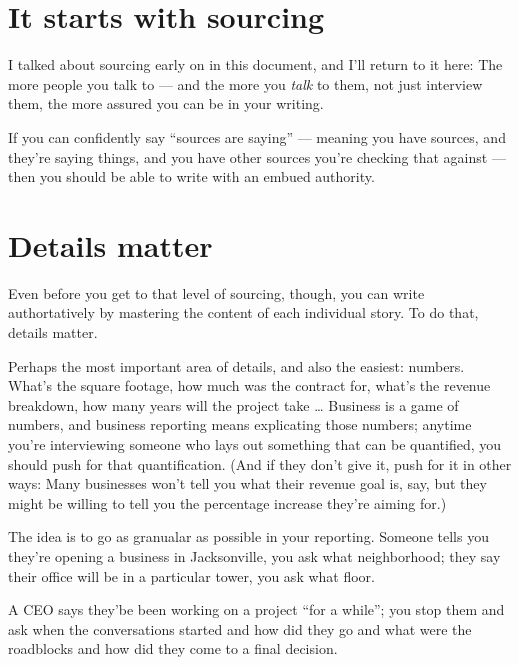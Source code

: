 \documentclass[
  11pt,
  american,
  letterpaperpaper,
  extrafontsizes,onecolumn,openright
  ]{memoir}
\begin{document}
\hypertarget{it-starts-with-sourcing}{%
\section*{It starts with sourcing}\label{it-starts-with-sourcing}}

I talked about sourcing early on in this document, and I'll return to it here: The more people you talk to --- and the more you \emph{talk} to them, not just interview them, the more assured you can be in your writing.

If you can confidently say \enquote{sources are saying} --- meaning you have sources, and they're saying things, and you have other sources you're checking that against --- then you should be able to write with an embued authority.

\hypertarget{details-matter}{%
\section*{Details matter}\label{details-matter}}

Even before you get to that level of sourcing, though, you can write authortatively by mastering the content of each individual story. To do that, details matter.

Perhaps the most important area of details, and also the easiest: numbers. What's the square footage, how much was the contract for, what's the revenue breakdown, how many years will the project take \ldots{} Business is a game of numbers, and business reporting means explicating those numbers; anytime you're interviewing someone who lays out something that can be quantified, you should push for that quantification. (And if they don't give it, push for it in other ways: Many businesses won't tell you what their revenue goal is, say, but they might be willing to tell you the percentage increase they're aiming for.)

The idea is to go as granualar as possible in your reporting. Someone tells you they're opening a business in Jacksonville, you ask what neighborhood; they say their office will be in a particular tower, you ask what floor.

A CEO says they'be been working on a project \enquote{for a while}; you stop them and ask when the conversations started and how did they go and what were the roadblocks and how did they come to a final decision.
\end{document}
